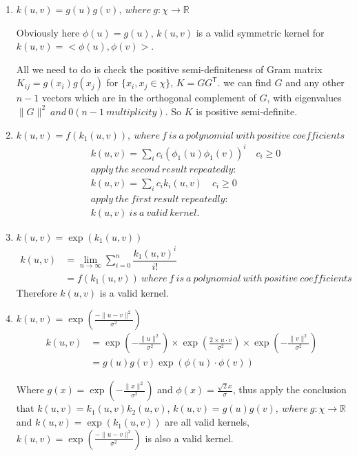 \documentclass[a4paper,12pt]{article}
\begin{document}
\begin{enumerate} [label = $\bullet$]
   \item $k(u,v) = g(u)g(v), \ where \ g: \chi \rightarrow \mathbb{R}$
   
   Obviously here $\phi(u) = g(u)$, $k(u,v)$ is a valid symmetric kernel for $k(u,v) = <\phi(u) ,\phi(v)>$.
   
   All we need to do is check the positive semi-definiteness of Gram matrix $K_{ij} = g(x_i) g(x_j)$ for $\{x_i, x_j \in \chi\}$, $K = G G^{\mathsf{T}}$. we can find $G$ and any other $n-1$ vectors which are in the orthogonal complement of $G$, with eigenvalues $\lVert G\rVert^2 \ and \ 0 (n - 1 \ multiplicity)$. So $K$ is positive semi-definite. 
   
   \item $k(u,v) = f(k_1(u,v)), \ where \ f \ is \ a\ polynomial\ with \ positive \ coefficients$
   \begin{align} 
   &k(u,v) = \sum_{i} c_i (\phi_1(u) \phi_1(v))^i \quad  c_i \geq 0 \nonumber \\
   &apply\ the\ second \ result\ repeatedly: \nonumber \\
   &k(u,v) = \sum_{i} c_i k_i(u,v) \quad  c_i \geq 0 \nonumber \\
   &apply \ the \ first\  result\ repeatedly:\nonumber \\
   &k(u,v) \ is\ a \ valid \ kernel . \nonumber 
   \end{align}
   
   \item $k(u,v) = \exp(k_1(u,v))$
    \begin{align}
      k(u,v) & =  \lim_{n \rightarrow \infty} \sum_{i = 0}^{n} \dfrac{k_1(u,v)^i}{i!}\nonumber \\
      & = f(k_1(u,v)) \ where \ f \ is \ a\ polynomial\ with \ positive \ coefficients \nonumber
     \end{align}
    Therefore $k(u,v)$ is a valid kernel.
    
   \item $k(u,v) = \exp(\frac{-\lVert u - v \rVert^2}{\sigma^2})$ 
     \begin{align}
      k(u,v) & =  \exp(- \frac{\lVert u\rVert^2}{\sigma^2})  \times \exp(\frac{2 \times u \cdot v}{\sigma^2}) \times \exp( -\frac{\lVert v \rVert^2}{\sigma^2})  \nonumber \\
      & = g(u)g(v) \exp(\phi(u) \cdot \phi(v))  \nonumber 
     \end{align}
     
    Where $g(x) = \exp(-\frac{\lVert x\rVert^2}{\sigma^2})$ and $\phi(x) = \frac{\sqrt{2} x}{\sigma}$, thus apply the conclusion that $k(u,v) = k_1(u,v) k_2(u,v)$, $k(u,v) = g(u)g(v), \ where \ g: \chi \rightarrow \mathbb{R}$ and $k(u,v) = \exp(k_1(u,v))$ are all valid kernels,  $k(u,v) = \exp(\frac{-\lVert u - v \rVert^2}{\sigma^2})$ is also a valid kernel.
\end{enumerate}
\end{document}
